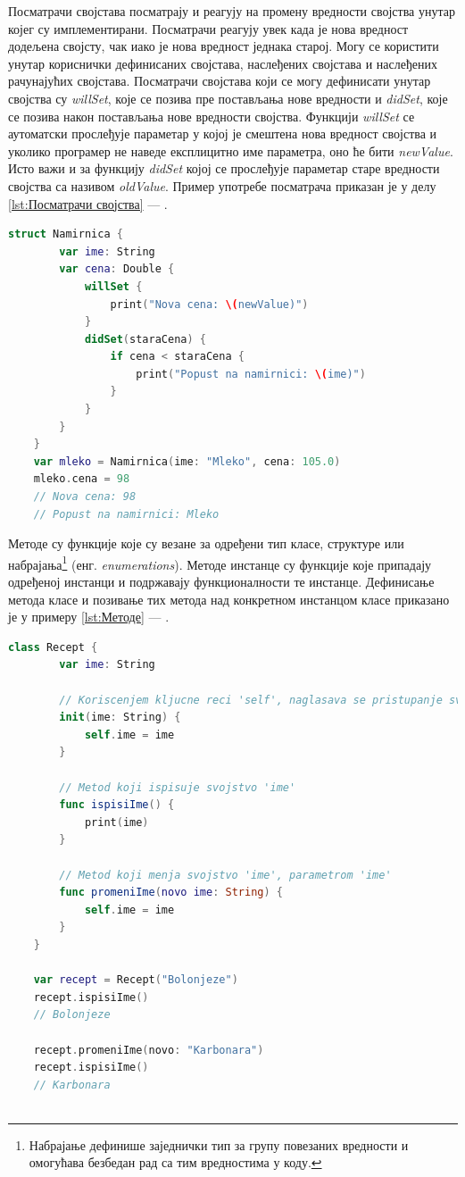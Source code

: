 \documentclass[12pt,oneside]{memoir}
\begin{document}
\indent Посматрачи својстава посматрају и реагују на промену вредности својства унутар којег су имплементирани. Посматрачи реагују увек када је нова вредност додељена својсту, чак иако је нова вредност једнака старој. Могу се користити унутар кориснички дефинисаних својстава, наслеђених својстава и наслеђених рачунајућих својстава. Посматрачи својстава који се могу дефинисати унутар својства су \textit{willSet}, које се позива пре постављања нове вредности и \textit{didSet}, које се позива након постављања нове вредности својства. Функцији \textit{willSet} се аутоматски прослеђује параметар у којој је смештена нова вредност својства и уколико програмер не наведе експлицитно име параметра, оно ће бити \textit{newValue}. Исто важи и за функцију \textit{didSet} којој се прослеђује параметар старе вредности својства са називом \textit{oldValue}. Пример употребе посматрача приказан је у делу \ref{lst:Посматрачи својства} --- .

\begin{lstlisting}[caption=\textit{{Посматрачи својства}}, label={lst:Посматрачи својства}, language=Swift, frame=single]
    struct Namirnica {
        var ime: String
        var cena: Double {
            willSet {
                print("Nova cena: \(newValue)")
            }
            didSet(staraCena) {
                if cena < staraCena {
                    print("Popust na namirnici: \(ime)")
                }
            }
        }
    }
    var mleko = Namirnica(ime: "Mleko", cena: 105.0)
    mleko.cena = 98
    // Nova cena: 98
    // Popust na namirnici: Mleko
\end{lstlisting}

\indent Методе су функције које су везане за одређени тип класе, структуре или набрајања\footnote{Набрајање дефинише заједнички тип за групу повезаних вредности и омогућава безбедан рад са тим вредностима у коду.} (енг. \textit{enumerations}). Методе инстанце су функције које припадају одређеној инстанци и подржавају функционалности те инстанце. Дефинисање метода класе и позивање тих метода над конкретном инстанцом класе приказано је у примеру \ref{lst:Методе} --- .

\begin{lstlisting}[caption=\textit{{Методе}}, label={lst:Методе}, language=Swift, frame=single]
    class Recept {
        var ime: String
        
        // Koriscenjem kljucne reci 'self', naglasava se pristupanje svojstvu/metodi klase
        init(ime: String) {
            self.ime = ime
        }
        
        // Metod koji ispisuje svojstvo 'ime'
        func ispisiIme() {
            print(ime)
        }
        
        // Metod koji menja svojstvo 'ime', parametrom 'ime'
        func promeniIme(novo ime: String) {
            self.ime = ime
        }
    }
    
    var recept = Recept("Bolonjeze")
    recept.ispisiIme()
    // Bolonjeze
    
    recept.promeniIme(novo: "Karbonara")
    recept.ispisiIme()
    // Karbonara
    
\end{lstlisting}
\end{document}
